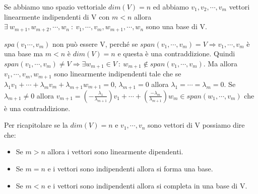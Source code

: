 \begin{proposition}
Se abbiamo uno spazio vettoriale $dim(V) = n$ ed abbiamo $v_1, v_2, \cdots, v_m$ vettori linearmente indipendenti di V con $m < n$ allora $\exists \: w_{m+1}, w_{m+2}, \cdots, w_n \::\: v_1, \cdots, v_m, w_{m+1}, \cdots, w_n$ sono una base di V.
\end{proposition}

\begin{demostration}
$spa(v_1 \cdots, v_m)$ non può essere V, perché se $span(v_1, \cdots, v_m) = V \Longrightarrow v_1, \cdots, v_m$ è una base ma $m<n$ è $dim(V) = n$ e questa è una contraddizione. Quindi $span(v_1,\cdots,v_m) \neq V \Longrightarrow \exists w_{m+1} \in V \::\: w_{m+1} \notin span(v_1, \cdots, v_m)$. Ma allora $v_1, \cdots, v_{m}, w_{m+1}$ sono linearmente indipendenti tale che se $\lambda_1v_1 + \cdots + \lambda_{m}v_m + \lambda_{m+1}w_{m+1} = 0$, $\lambda_{m+1} = 0 $ allora $\lambda_1 = \cdots = \lambda_m  = 0$. Se $\lambda_{m+1} \neq 0$ allora $v_{m+1} = (-\frac{\lambda_1}{\lambda_{m+1}})v_1 + \cdots + (\frac{-\lambda_m}{\lambda_{m+1}})w_m \in span(w_1, \cdots, v_m)$ che è una contraddizione.
\end{demostration}

\hspace{-15pt}Per ricapitolare se la $dim(V) = n$ e $v_1, \cdots, v_n$ sono vettori di V possiamo dire che:
\begin{itemize}
    \item Se $m > n$ allora i vettori sono linearmente dipendenti.
    \item Se $m = n$ e i vettori sono indipendenti allora si forma una base.
    \item Se $m < n$ e i vettori sono indipendenti allora si completa in una base di V.
\end{itemize} 

